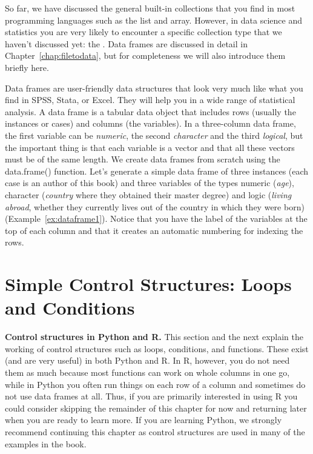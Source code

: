 So far, we have discussed the general built-in collections that you find in most programming languages
such as the list and array.
However, in data science and statistics you are very likely to encounter a specific collection type that we haven't discussed yet: the .
Data frames are discussed in detail in Chapter~\ref{chap:filetodata},
but for completeness we will also introduce them briefly here. 

Data frames are user-friendly data structures that look very much like
what you find in SPSS, Stata, or Excel. They will help you in a wide
range of statistical analysis.  A
data frame is a tabular data object that includes rows (usually the
instances or cases) and columns (the variables). In a three-column data frame,
the first variable can be \emph{numeric}, the second \emph{character}
and the third \emph{logical}, but the important thing is that each
variable is a vector and that all these vectors must be of the same
length. We create data frames from scratch using the data.frame()
function.  Let’s generate a simple data frame of three instances (each
case is an author of this book) and three variables of the types
numeric (\emph{age}), character (\emph{country} where they obtained their
master degree) and logic (\emph{living abroad}, whether they currently
lives out of the country in which they were born) (Example~\ref{ex:dataframe1}).
Notice that you have the label of the variables at the top of each column and that it creates an automatic numbering for indexing the rows.  


\section{Simple Control Structures: Loops and Conditions}	
\label{sec:controlstructures}

\begin{feature}\textbf{Control structures in Python and R.}
  This section and the next explain the working of control structures
  such as loops, conditions, and functions.
  These exist (and are very useful) in both Python and R.
  In R, however, you do not need them as much because most functions
  can work on whole columns in one go, while in Python you often run things
  on each row of a column and sometimes do not use data frames at all.
  Thus, if you are primarily interested in using R you could consider skipping
  the remainder of this chapter for now and returning later when you are ready to learn more.
  If you are learning Python, we strongly recommend continuing this chapter as
  control structures are used in many of the examples in the book.
  \end{feature}
  



